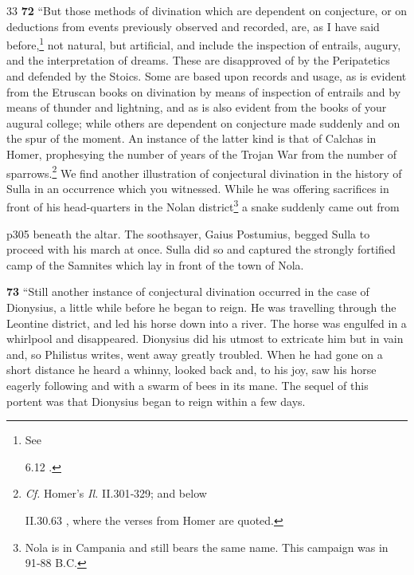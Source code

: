 33
\textbf{72} ``But those methods of divination which are dependent on conjecture, or on deductions from events previously observed and recorded, are, as I have said before,\texthebrew{}\footnote{See

6.12 .

} not natural, but artificial, and include the inspection of entrails, augury, and the interpretation of dreams. These are disapproved of by the Peripatetics and defended by the Stoics. Some are based upon records and usage, as is evident from the Etruscan books on divination by means of inspection of entrails and by means of thunder and lightning, and as is also evident from the books of your augural college; while others are dependent on conjecture made suddenly and on the spur of the moment. An instance of the latter kind is that of Calchas in Homer, prophesying the number of years of the Trojan War from the number of sparrows.\texthebrew{}\footnote{\emph{Cf.} Homer's \emph{Il.} II.301\texthebrew{‑}329; and below

II.30.63 , where the verses from Homer are quoted.

} We find another illustration of conjectural divination in the history of Sulla in an occurrence which you witnessed. While he was offering sacrifices in front of his head-quarters in the Nolan district\texthebrew{}\footnote{Nola is in Campania and still bears the same name. This campaign was in 91\texthebrew{‑}88 B.C.

} a snake suddenly came out from

p305 beneath the altar. The soothsayer, Gaius Postumius, begged Sulla to proceed with his march at once. Sulla did so and captured the strongly fortified camp of the Samnites which lay in front of the town of Nola.

\textbf{73} ``Still another instance of conjectural divination occurred in the case of Dionysius, a little while before he began to reign. He was travelling through the Leontine district, and led his horse down into a river. The horse was engulfed in a whirlpool and disappeared. Dionysius did his utmost to extricate him but in vain and, so Philistus writes, went away greatly troubled. When he had gone on a short distance he heard a whinny, looked back and, to his joy, saw his horse eagerly following and with a swarm of bees in its mane. The sequel of this portent was that Dionysius began to reign within a few days.


